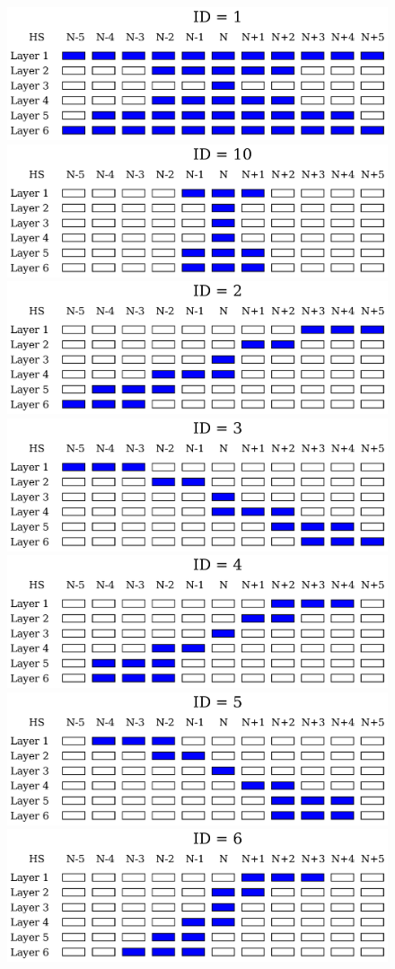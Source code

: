 \begin{figure}[tbh]
        \begin{center}
                \includegraphics[width=0.48\linewidth]{figures/clct_pattern_01.pdf}
                \includegraphics[width=0.48\linewidth]{figures/clct_pattern_10.pdf}\\
                \includegraphics[width=0.48\linewidth]{figures/clct_pattern_02.pdf}
                \includegraphics[width=0.48\linewidth]{figures/clct_pattern_03.pdf}\\
                \includegraphics[width=0.48\linewidth]{figures/clct_pattern_04.pdf}
                \includegraphics[width=0.48\linewidth]{figures/clct_pattern_05.pdf}\\
                \includegraphics[width=0.48\linewidth]{figures/clct_pattern_06.pdf}

\end{center}
\end{figure}
